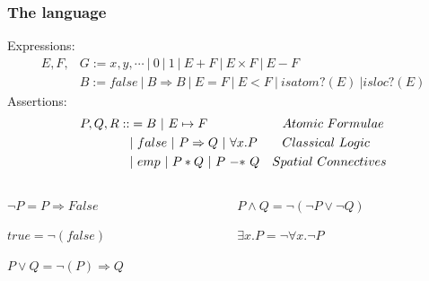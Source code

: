 \documentclass[professionalfont]{beamer}
\begin{document}
    \begin{frame}
        \frametitle{The language}
        
        Expressions:
        \begin{equation*}
            \begin{split}
            E,F,&G := x,y,\cdots\ |\ 0\ |\ 1\ |\ E + F\ |\ E \times F\ |\ E - F \\
            &B := false\ |\ B \Rightarrow B\ |\ E=F\ |\ E<F\ |\ isatom?(E)\ | isloc?(E)
            \end{split}
        \end{equation*}
    \pause
    Assertions:
     \begin{equation*}
        \begin{split}
        P,Q,R ::&= B\ |\ E \mapsto F \hspace{21mm}Atomic\ Formulae \\
            &|\ false\ |\ P \Rightarrow Q\ |\ \forall x.P \hspace{7mm}Classical\ Logic \\
            &|\ emp\  |\ P * Q\ |\ P\ {-*}\ Q \quad Spatial\ Connectives
        \end{split}      
     \end{equation*}
     
     \begin{columns}
         \begin{column}{.5\textwidth}
             \pause
             $\neg P = P \Rightarrow False$
             
             
             $true = \neg(false)$
             
             
             $P \vee Q = \neg(P) \Rightarrow Q$  
         \end{column}
         \begin{column}{.5\textwidth}
             \pause
             $P \wedge Q = \neg(\neg P \vee \neg Q)$

             $\exists x.P = \neg\forall x.\neg P$
         \end{column}
     \end{columns}
    \end{frame}
\end{document}
